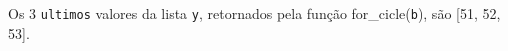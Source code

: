 \documentclass[12pt,varwidth=16cm,border=1pt]{standalone}
\begin{document}
Os 3 \verb+ultimos+ valores da lista \verb+y+, retornados pela função for\_cicle(\verb+b+), são [51, 52, 53].

\questiomfalse
\end{document}
